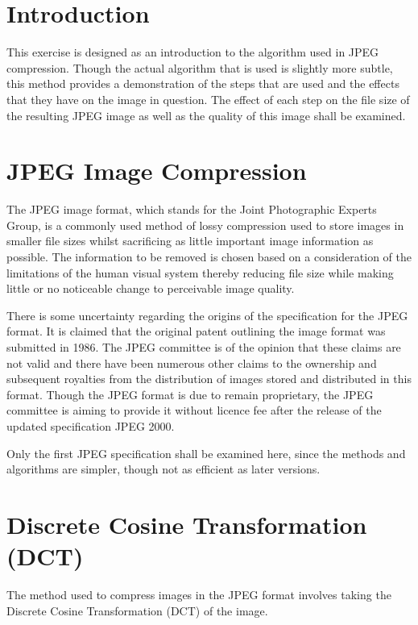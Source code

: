 
\section{Introduction} %
	\label{sec:introduction}
	This exercise is designed as an introduction to the algorithm used in JPEG compression. Though the actual algorithm that is used is slightly more subtle, this method provides a demonstration of the steps that are used and the effects that they have on the image in question. The effect of each step on the file size of the resulting JPEG image as well as the quality of this image shall be examined.

\section{JPEG Image Compression} %
	\label{sec:jpeg_image_compression}
	The JPEG image format, which stands for the Joint Photographic Experts Group, is a commonly used method of lossy compression used to store images in smaller file sizes whilst sacrificing as little important image information as possible. The information to be removed is chosen based on a consideration of the limitations of the human visual system thereby reducing file size while making little or no noticeable change to perceivable image quality.

	There is some uncertainty regarding the origins of the specification for the JPEG format. It is claimed that the original patent outlining the image format was submitted in 1986. The JPEG committee is of the opinion that these claims are not valid and there have been numerous other claims to the ownership and subsequent royalties from the distribution of images stored and distributed in this format. Though the JPEG format is due to remain proprietary, the JPEG committee is aiming to provide it without licence fee after the release of the updated specification JPEG 2000.

	Only the first JPEG specification shall be examined here, since the methods and algorithms are simpler, though not as efficient as later versions.

\section{Discrete Cosine Transformation (DCT)} %
	\label{sec:discrete_cosine_transformation_}
	The method used to compress images in the JPEG format involves taking the Discrete Cosine Transformation (DCT) of the image.

